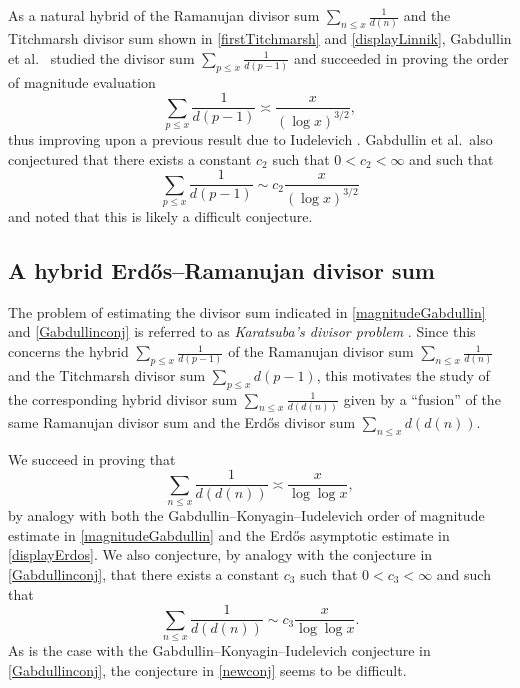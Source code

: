 \documentclass[12pt]{article}
\begin{document}
 As a natural hybrid of the Ramanujan divisor sum $ \sum_{n \leq x} \frac{1}{d(n)}$ and the Titchmarsh divisor sum shown in 
 \eqref{firstTitchmarsh} and \eqref{displayLinnik}, 
 Gabdullin et al.\ \cite{GabdullinKonyaginIudelevich2023}
 studied the divisor sum 
 $\sum_{p\leq x} \frac{1}{d(p-1)}$ and succeeded in proving 
 the order of magnitude evaluation 
\begin{equation}\label{magnitudeGabdullin}
 \sum_{p\leq x} \frac{1}{d(p-1)} \asymp \frac{x}{(\log x)^{3/2}}, 
\end{equation}
 thus improving upon a previous result due to Iudelevich \cite{Iudelevich2022}. Gabdullin et al.\ also conjectured that there exists a 
 constant $c_2$ such that $0 < c_2 < \infty$ and such that 
\begin{equation}\label{Gabdullinconj}
 \sum_{p\leq x} \frac{1}{d(p-1)} \sim c_{2} \frac{x}{(\log x)^{3/2}}
\end{equation}
 and noted that this is likely a difficult conjecture. 

\subsection{A hybrid Erd\H{o}s--Ramanujan divisor sum}
 The problem of estimating the divisor sum indicated in \eqref{magnitudeGabdullin} and \eqref{Gabdullinconj} is referred to as 
 \emph{Karatsuba’s divisor problem} \cite{GabdullinKonyaginIudelevich2023,Iudelevich2022}. Since this concerns the hybrid $\sum_{p 
 \leq x} \frac{1}{d(p-1)}$ of the Ramanujan divisor sum $\sum_{n\leq x} \frac{1}{d(n)}$ and the Titchmarsh divisor sum $\sum_{p \leq 
 x} d(p - 1)$, this motivates the study of the corresponding hybrid divisor sum 
 $\sum_{n \leq x} \frac{1}{d(d(n))}$ given by 
 a ``fusion'' of the same Ramanujan divisor sum 
 and the Erd\H os divisor sum $\sum_{n \leq x} d(d(n))$. 

 We succeed in proving that $$\sum_{n \leq x} \frac{1}{d(d(n))} \asymp \frac{x}{ \log \log x}, $$ by analogy with both the 
 Gabdullin--Konyagin--Iudelevich order of magnitude estimate in \eqref{magnitudeGabdullin} and the Erd\H os asymptotic estimate in 
 \eqref{displayErdos}. We also conjecture, by analogy with the   conjecture in \eqref{Gabdullinconj}, that there exists a constant  $c_{3}$ such  
  that $0 < c_{3} < \infty$ and such that 
\begin{equation}\label{newconj}
 \sum_{n \leq x} \frac{1}{d(d(n))} \sim c_{3} \frac{x}{ \log \log x}. 
\end{equation}
 As is the case with the Gabdullin--Konyagin--Iudelevich conjecture in   \eqref{Gabdullinconj}, the conjecture in \eqref{newconj} seems to 
  be difficult. 
 
\end{document}
